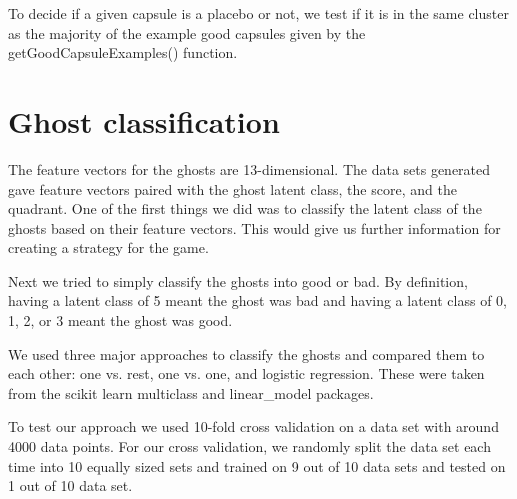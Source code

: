 \documentclass[11pt]{amsart}
\begin{document}
To decide if a given capsule is a placebo or not, we test if it is in the same cluster as the majority of the example good capsules given by the getGoodCapsuleExamples() function.

\pagebreak

\section{Ghost classification}

The feature vectors for the ghosts are 13-dimensional. The data sets generated gave feature vectors paired with the ghost latent class, the score, and the quadrant. One of the first things we did was to classify the latent class of the ghosts based on their feature vectors. This would give us further information for creating a strategy for the game. 

Next we tried to simply classify the ghosts into good or bad. By definition, having a latent class of 5 meant the ghost was bad and having a latent class of 0, 1, 2, or 3 meant the ghost was good.

We used three major approaches to classify the ghosts and compared them to each other: one vs. rest, one vs. one, and logistic regression. These were taken from the scikit learn multiclass and linear\_model packages.

To test our approach we used 10-fold cross validation on a data set with around 4000 data points. For our cross validation, we randomly split the data set each time into 10 equally sized sets and trained on 9 out of 10 data sets and tested on 1 out of 10 data set. 
\end{document}
